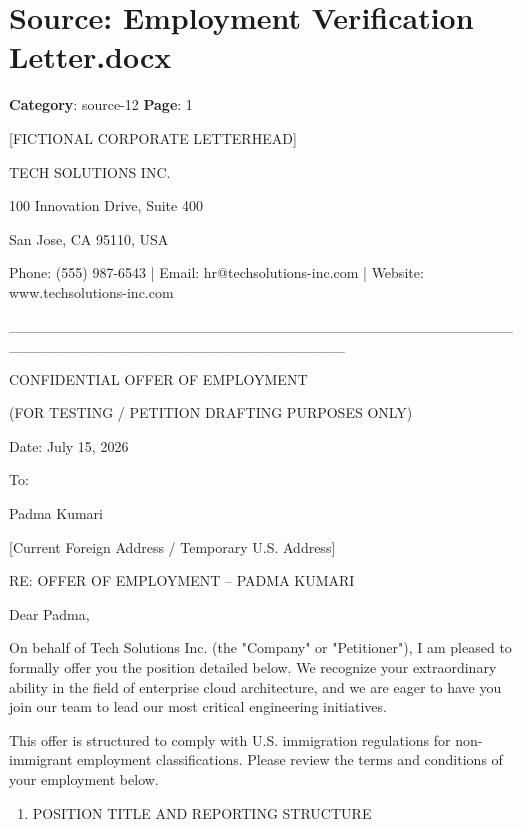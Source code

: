 \section*{Source:  Employment Verification Letter.docx}
\textbf{Category}: source-12
\textbf{Page}: 1

[FICTIONAL CORPORATE LETTERHEAD]

TECH SOLUTIONS INC.

100 Innovation Drive, Suite 400

San Jose, CA 95110, USA

Phone: (555) 987-6543 | Email: hr@techsolutions-inc.com | Website: www.techsolutions-inc.com

\_\_\_\_\_\_\_\_\_\_\_\_\_\_\_\_\_\_\_\_\_\_\_\_\_\_\_\_\_\_\_\_\_\_\_\_\_\_\_\_\_\_\_\_\_\_\_\_\_\_\_\_\_\_\_\_\_\_\_\_\_\_\_\_\_\_\_\_\_\_\_\_\_\_\_\_\_\_\_\_

CONFIDENTIAL OFFER OF EMPLOYMENT

(FOR TESTING / PETITION DRAFTING PURPOSES ONLY)

Date: July 15, 2026

To:

Padma Kumari

[Current Foreign Address / Temporary U.S. Address]

RE: OFFER OF EMPLOYMENT – PADMA KUMARI

Dear Padma,

On behalf of Tech Solutions Inc. (the "Company" or "Petitioner"), I am pleased to formally offer you the position detailed below. We recognize your extraordinary ability in the field of enterprise cloud architecture, and we are eager to have you join our team to lead our most critical engineering initiatives.

This offer is structured to comply with U.S. immigration regulations for non-immigrant employment classifications. Please review the terms and conditions of your employment below.

\begin{enumerate}

\item POSITION TITLE AND REPORTING STRUCTURE

\end{enumerate}


